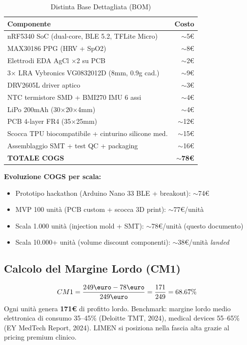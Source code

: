 \documentclass[12pt,a4paper]{article}
\begin{document}
\begin{table}[h!]
    \centering
    \small
    \caption{Distinta Base Dettagliata (BOM)}
    \vspace{0.3cm}
    \begin{tabularx}{\textwidth}{@{}X r@{}}
        \toprule
        \textbf{Componente} & \textbf{Costo} \\ \midrule
        nRF5340 SoC (dual-core, BLE 5.2, TFLite Micro) & $\sim$5\euro \\
        MAX30186 PPG (HRV + SpO2) & $\sim$8\euro \\
        Elettrodi EDA AgCl $\times$2 su PCB & $\sim$2\euro \\
        3$\times$ LRA Vybronics VG0832012D (8mm, 0.9g cad.) & $\sim$9\euro \\
        DRV2605L driver aptico & $\sim$3\euro \\
        NTC termistore SMD + BMI270 IMU 6 assi & $\sim$4\euro \\
        LiPo 200mAh (30$\times$20$\times$4mm) & $\sim$4\euro \\
        PCB 4-layer FR4 (35$\times$25mm) & $\sim$12\euro \\
        Scocca TPU biocompatibile + cinturino silicone med. & $\sim$15\euro \\
        Assemblaggio SMT + test QC + packaging & $\sim$16\euro \\
        \midrule
        \textbf{TOTALE COGS} & \textbf{$\sim$78\euro} \\
        \bottomrule
    \end{tabularx}
\end{table}

\textbf{Evoluzione COGS per scala:}
\begin{itemize}
    \item Prototipo hackathon (Arduino Nano 33 BLE + breakout): $\sim$74\euro
    \item MVP 100 unità (PCB custom + scocca 3D print): $\sim$77\euro/unità
    \item Scala 1.000 unità (injection mold + SMT): $\sim$78\euro/unità (questo documento)
    \item Scala 10.000+ unità (volume discount componenti): $\sim$38\euro/unità \textit{landed}
\end{itemize}

\subsection{Calcolo del Margine Lordo (CM1)}
\begin{equation}
    CM1 = \frac{249\text{\euro} - 78\text{\euro}}{249\text{\euro}} = \frac{171}{249} = 68.67\%
\end{equation}
Ogni unità genera \textbf{171\euro} di profitto lordo. Benchmark: margine lordo medio elettronica di consumo 35--45\% (Deloitte TMT, 2024), medical devices 55--65\% (EY MedTech Report, 2024). LIMEN si posiziona nella fascia alta grazie al pricing premium clinico.
\end{document}

